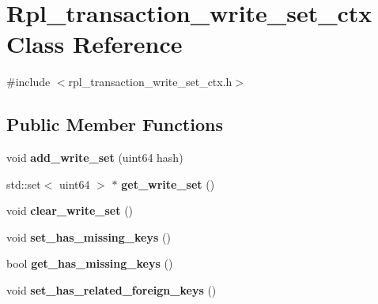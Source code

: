 \hypertarget{classRpl__transaction__write__set__ctx}{}\section{Rpl\+\_\+transaction\+\_\+write\+\_\+set\+\_\+ctx Class Reference}
\label{classRpl__transaction__write__set__ctx}


{\ttfamily \#include $<$rpl\+\_\+transaction\+\_\+write\+\_\+set\+\_\+ctx.\+h$>$}

\subsection*{Public Member Functions}
\begin{DoxyCompactItemize}
\item 
\mbox{\label{classRpl__transaction__write__set__ctx_a3d908f0ba5a685b14218b0c22aedb1eb}} 
void {\bfseries add\+\_\+write\+\_\+set} (uint64 hash)
\item 
\mbox{\label{classRpl__transaction__write__set__ctx_ad03c62f17609a9915ecde0bdc8a39189}} 
std\+::set$<$ uint64 $>$ $\ast$ {\bfseries get\+\_\+write\+\_\+set} ()
\item 
\mbox{\label{classRpl__transaction__write__set__ctx_adfa492edc4803f5069f5d8f4b811c4af}} 
void {\bfseries clear\+\_\+write\+\_\+set} ()
\item 
\mbox{\label{classRpl__transaction__write__set__ctx_ac2e94f0a3a2b24e3d61c4260c226a2a5}} 
void {\bfseries set\+\_\+has\+\_\+missing\+\_\+keys} ()
\item 
\mbox{\label{classRpl__transaction__write__set__ctx_af508c96bd399d324d4411268d370f660}} 
bool {\bfseries get\+\_\+has\+\_\+missing\+\_\+keys} ()
\item 
\mbox{\label{classRpl__transaction__write__set__ctx_a7ae5ffc4fab7b5e05cec6a59fca0534d}} 
void {\bfseries set\+\_\+has\+\_\+related\+\_\+foreign\+\_\+keys} ()
\item 

\end{DoxyCompactItemize}

